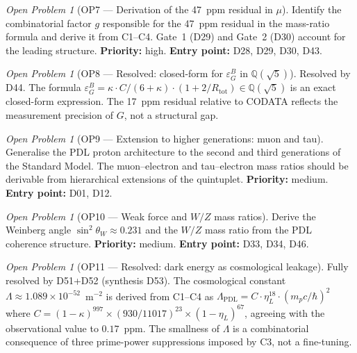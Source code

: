 \documentclass[11pt,a4paper]{article}
\theoremstyle{plain}
\theoremstyle{definition}
\theoremstyle{remark}
\newtheorem{openproblem}[theorem]{Open Problem}
\newcommand{\Rtot}{R_{\mathrm{tot}}}
\newcommand{\epsGeomB}{\varepsilon_G^B}
\begin{document}
\begin{openproblem}[OP7 --- Derivation of the 47~ppm residual in $\mu$]
\label{op:residual}
Identify the combinatorial factor $g$ responsible for the 47~ppm residual in the mass-ratio formula and derive it from C1--C4. Gate~1 (D29) and Gate~2 (D30) account for the leading structure. \textbf{Priority:} high. \textbf{Entry point:} D28, D29, D30, D43.
\end{openproblem}

\begin{openproblem}[OP8 --- Resolved: closed-form for $\epsGeomB$ in $\mathbb{Q}(\sqrt{5})$]
\label{op:epsGeomB}
\textcolor{proofblue}{Resolved by D44.} The formula $\epsGeomB = \kappa \cdot C/(6+\kappa)\cdot(1+2/\Rtot) \in \mathbb{Q}(\sqrt{5})$ is an exact closed-form expression. The 17~ppm residual relative to CODATA reflects the measurement precision of $G$, not a structural gap.
\end{openproblem}

\begin{openproblem}[OP9 --- Extension to higher generations: muon and tau]
\label{op:generations}
Generalise the PDL proton architecture to the second and third generations of the Standard Model. The muon--electron and tau--electron mass ratios should be derivable from hierarchical extensions of the quintuplet. \textbf{Priority:} medium. \textbf{Entry point:} D01, D12.
\end{openproblem}

\begin{openproblem}[OP10 --- Weak force and $W/Z$ mass ratios]
\label{op:weak}
Derive the Weinberg angle $\sin^2\theta_W\approx 0.231$ and the $W/Z$ mass ratio from the PDL coherence structure. \textbf{Priority:} medium. \textbf{Entry point:} D33, D34, D46.
\end{openproblem}

\begin{openproblem}[OP11 --- Resolved: dark energy as cosmological leakage]
\label{op:darkenergy}
\textcolor{proofblue}{Fully resolved by D51+D52 (synthesis D53).} The cosmological constant $\Lambda \approx 1.089 \times 10^{-52}$~m$^{-2}$ is derived from C1--C4 as $\Lambda_{\mathrm{PDL}} = C \cdot \eta_L^{18} \cdot (m_p c/\hbar)^2$ where $C = (1-\kappa)^{997} \times (930/11017)^{23} \times (1-\eta_L)^{67}$, agreeing with the observational value to $0.17$~ppm. The smallness of $\Lambda$ is a combinatorial consequence of three prime-power suppressions imposed by C3, not a fine-tuning.
\end{openproblem}
\end{document}
